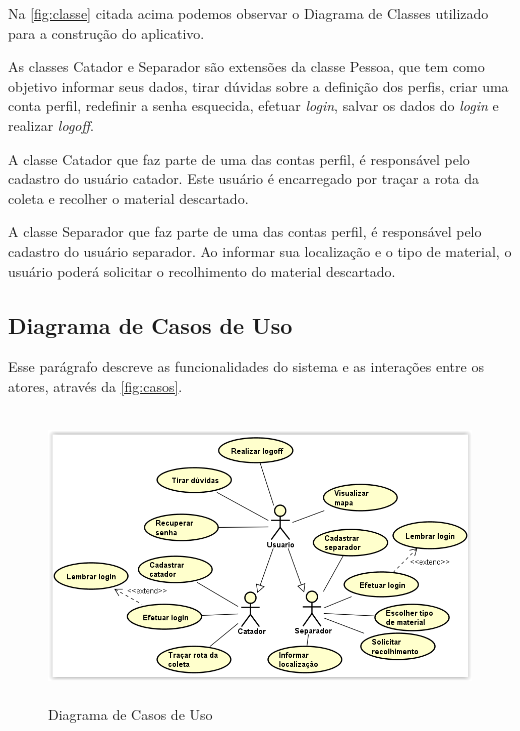 
Na \autoref{fig:classe} citada acima podemos observar o Diagrama de Classes utilizado para a construção do aplicativo.

As classes Catador e Separador são extensões da classe Pessoa, que tem como objetivo informar seus dados, tirar dúvidas sobre a definição dos perfis, criar uma conta perfil, redefinir a senha esquecida, efetuar \textit{login}, salvar os dados do \textit{login} e realizar \textit{logoff}.

A classe Catador que faz parte de uma das contas perfil, é responsável pelo cadastro do usuário catador. Este usuário é encarregado por traçar a rota da coleta e recolher o material descartado.

A classe Separador que faz parte de uma das contas perfil, é responsável pelo cadastro do usuário separador. Ao informar sua localização e o tipo de material, o usuário poderá solicitar o recolhimento do material descartado.

\subsection{Diagrama de Casos de Uso}

Esse parágrafo descreve as funcionalidades do sistema e as interações entre os atores, através da \autoref{fig:casos}. 


\begin{figure}[H]
	\begin{Center}
		\includegraphics[width=5.12in,height=3.02in]{./media/image32.png}
	\end{Center}
	\caption{Diagrama de Casos de Uso}
	\label{fig:casos}
\end{figure}


